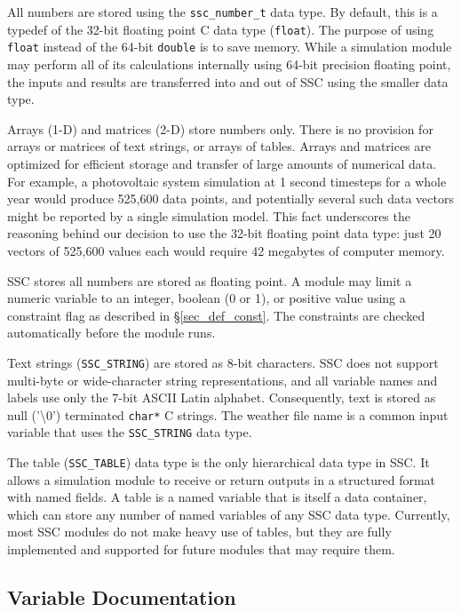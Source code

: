 \documentclass{scrartcl} %
\begin{document}
All numbers are stored using the \texttt{ssc\_number\_t} data type.  By default, this is a typedef of the 32-bit floating point C data type (\texttt{float}).  The purpose of using \texttt{float} instead of the 64-bit \texttt{double} is to save memory.  While a simulation module may perform all of its calculations internally using 64-bit precision floating point, the inputs and results are transferred into and out of SSC using the smaller data type.

Arrays (1-D) and matrices (2-D) store numbers only. There is no provision for arrays or matrices of text strings, or arrays of tables.  Arrays and matrices are optimized for efficient storage and transfer of large amounts of numerical data.  For example, a photovoltaic system simulation at 1 second timesteps for a whole year would produce 525,600 data points, and potentially several such data vectors might be reported by a single simulation model.  This fact underscores the reasoning behind our decision to use the 32-bit floating point data type: just 20 vectors of 525,600 values each would require 42 megabytes of computer memory.

SSC stores all numbers are stored as floating point. A module may limit a numeric variable to an integer, boolean (0 or 1), or positive value using a constraint flag as described in \S\ref{sec_def_const}. The constraints are checked automatically before the module runs.

Text strings (\texttt{SSC\_STRING})  are stored as 8-bit characters.  SSC does not support multi-byte or wide-character string representations, and all variable names and labels use only the 7-bit ASCII Latin alphabet.  Consequently, text is stored as null ('\textbackslash 0') terminated \texttt{char*} C strings.  The weather file name is a common input variable that uses the \texttt{SSC\_STRING} data type.

The table (\texttt{SSC\_TABLE}) data type is the only hierarchical data type in SSC.  It allows a simulation module to receive or return outputs in a structured format with named fields.  A table is a named variable that is itself a data container, which can store any number of named variables of any SSC data type.  Currently, most SSC modules do not make heavy use of tables, but they are fully implemented and supported for future modules that may require them.

\subsection{Variable Documentation}
\label{sec_variable_docs}
\end{document}
